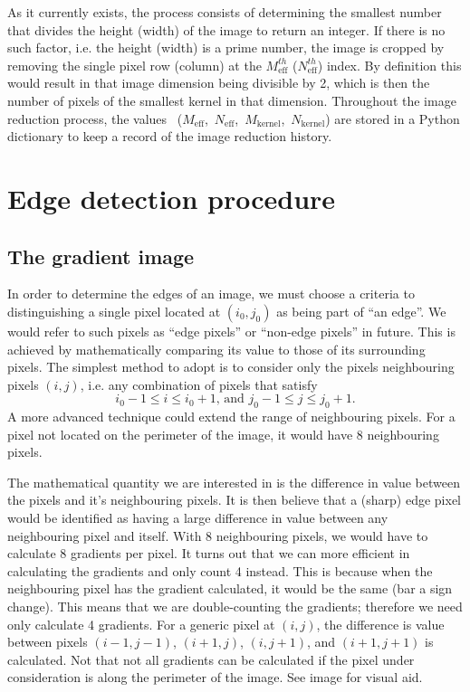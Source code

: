 \documentclass[11pt]{article}
\begin{document}
As it currently exists, the process consists of determining the smallest number that divides the height (width) of the image to return an integer. If there is no such factor, i.e. the height (width) is a prime number, the image is cropped by removing the single pixel row (column) at the $M_{\text{eff}}^{th}$ ($N_{\text{eff}}^{th}$) index. By definition this would result in that image dimension being divisible by 2, which is then the number of pixels of the smallest kernel in that dimension. Throughout the image reduction process, the values ~{($M_{\text{eff}}$,~$N_{\text{eff}}$,~$M_{\text{kernel}}$,~$N_{\text{kernel}}$)} are stored in a Python dictionary to keep a record of the image reduction history.




\section{Edge detection procedure}
\subsection{The gradient image}
In order to determine the edges of an image, we must choose a criteria to distinguishing a single pixel located at $(i_0,j_0)$ as being part of ``an edge''. We would refer to such pixels as ``edge pixels'' or ``non-edge pixels'' in future. This is achieved by mathematically comparing its value to those of its surrounding pixels. The simplest method to adopt is to consider only the pixels neighbouring pixels $(i,j)$, i.e. any combination of pixels that satisfy
\begin{equation}
i_0-1 \leq i \leq i_0+1\text{, and }j_0-1 \leq j \leq j_0+1\text{.}
\end{equation}
A more advanced technique could extend the range of neighbouring pixels. For a pixel not located on the perimeter of the image, it would have 8 neighbouring pixels.

The mathematical quantity we are interested in is the difference in value between the pixels and it's neighbouring pixels. It is then believe that a (sharp) edge pixel would be identified as having a large difference in value between any neighbouring pixel and itself. With 8 neighbouring pixels, we would have to calculate 8 gradients per pixel. It turns out that we can more efficient in calculating the gradients and only count 4 instead. This is because when the neighbouring pixel has the gradient calculated, it would be the same (bar a sign change). This means that we are double-counting the gradients; therefore we need only calculate 4 gradients. For a generic pixel at $(i,j)$, the difference is value between pixels $(i-1,j-1)$, $(i+1,j)$, $(i,j+1)$, and $(i+1,j+1)$ is calculated. Not that not all gradients can be calculated if the pixel under consideration is along the perimeter of the image. See image for visual aid.
\end{document}
